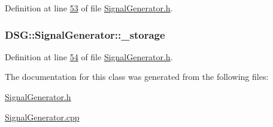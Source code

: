 Definition at line \hyperlink{_signal_generator_8h_source_l00053}{53} of file \hyperlink{_signal_generator_8h_source}{Signal\+Generator.\+h}.

\hypertarget{class_d_s_g_1_1_signal_generator_a28a9b47a1aa0783029f11a19ba0363f2}{
\subsubsection[{\+\_\+storage}]{ D\+S\+G\+::\+Signal\+Generator\+::\+\_\+storage\hspace{0.3cm}{\ttfamily [protected]}}}\label{class_d_s_g_1_1_signal_generator_a28a9b47a1aa0783029f11a19ba0363f2}


Definition at line \hyperlink{_signal_generator_8h_source_l00054}{54} of file \hyperlink{_signal_generator_8h_source}{Signal\+Generator.\+h}.



The documentation for this class was generated from the following files\+:\begin{DoxyCompactItemize}
\item 
\hyperlink{_signal_generator_8h}{Signal\+Generator.\+h}\item 
\hyperlink{_signal_generator_8cpp}{Signal\+Generator.\+cpp}\end{DoxyCompactItemize}
